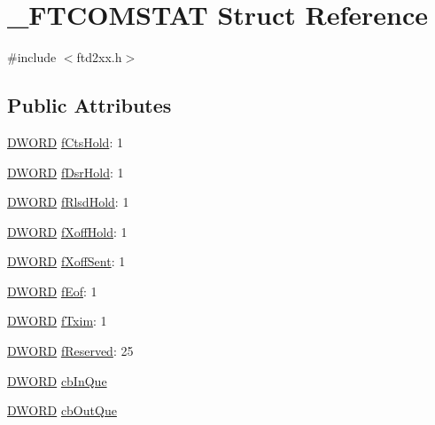 \hypertarget{struct__FTCOMSTAT}{
\section{\_\-FTCOMSTAT Struct Reference}
\label{struct__FTCOMSTAT}
}


{\ttfamily \#include $<$ftd2xx.h$>$}\subsection*{Public Attributes}
\begin{DoxyCompactItemize}
\item 
\hyperlink{LALUsbx64_2include_2WinTypes_8h_ad342ac907eb044443153a22f964bf0af}{DWORD} \hyperlink{struct__FTCOMSTAT_ad78060ad831dfa35a9e2db1103a54c3f}{fCtsHold}: 1
\item 
\hyperlink{LALUsbx64_2include_2WinTypes_8h_ad342ac907eb044443153a22f964bf0af}{DWORD} \hyperlink{struct__FTCOMSTAT_a63c6ff1a00dd690b0bf9347c949a59c8}{fDsrHold}: 1
\item 
\hyperlink{LALUsbx64_2include_2WinTypes_8h_ad342ac907eb044443153a22f964bf0af}{DWORD} \hyperlink{struct__FTCOMSTAT_afb2b9a88896f528efbe6c9ff73b7744c}{fRlsdHold}: 1
\item 
\hyperlink{LALUsbx64_2include_2WinTypes_8h_ad342ac907eb044443153a22f964bf0af}{DWORD} \hyperlink{struct__FTCOMSTAT_a5b2fd786cc95e60df49aa55f7d4d7d5a}{fXoffHold}: 1
\item 
\hyperlink{LALUsbx64_2include_2WinTypes_8h_ad342ac907eb044443153a22f964bf0af}{DWORD} \hyperlink{struct__FTCOMSTAT_a5a28cf3c2aea49110593931c78934416}{fXoffSent}: 1
\item 
\hyperlink{LALUsbx64_2include_2WinTypes_8h_ad342ac907eb044443153a22f964bf0af}{DWORD} \hyperlink{struct__FTCOMSTAT_a2a4cdfc245e72f74b032f7a5cc220fd3}{fEof}: 1
\item 
\hyperlink{LALUsbx64_2include_2WinTypes_8h_ad342ac907eb044443153a22f964bf0af}{DWORD} \hyperlink{struct__FTCOMSTAT_a04853d07abaf4fb47891a3bbdd78be8d}{fTxim}: 1
\item 
\hyperlink{LALUsbx64_2include_2WinTypes_8h_ad342ac907eb044443153a22f964bf0af}{DWORD} \hyperlink{struct__FTCOMSTAT_a567f611e7f3dc193ff94ac4c44fbc500}{fReserved}: 25
\item 
\hyperlink{LALUsbx64_2include_2WinTypes_8h_ad342ac907eb044443153a22f964bf0af}{DWORD} \hyperlink{struct__FTCOMSTAT_a995717c2425e3e52f046565bb60fbb3d}{cbInQue}
\item 
\hyperlink{LALUsbx64_2include_2WinTypes_8h_ad342ac907eb044443153a22f964bf0af}{DWORD} \hyperlink{struct__FTCOMSTAT_ab0fbaa7889620e204d2f583b6e31f848}{cbOutQue}
\end{DoxyCompactItemize}


